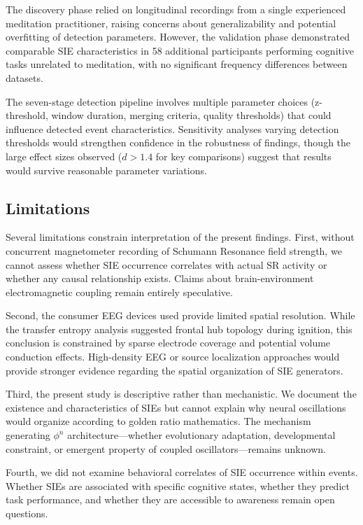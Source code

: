 \documentclass[11pt,a4paper]{article}
\begin{document}
The discovery phase relied on longitudinal recordings from a single experienced meditation practitioner, raising concerns about generalizability and potential overfitting of detection parameters. However, the validation phase demonstrated comparable SIE characteristics in 58 additional participants performing cognitive tasks unrelated to meditation, with no significant frequency differences between datasets.

The seven-stage detection pipeline involves multiple parameter choices (z-threshold, window duration, merging criteria, quality thresholds) that could influence detected event characteristics. Sensitivity analyses varying detection thresholds would strengthen confidence in the robustness of findings, though the large effect sizes observed ($d > 1.4$ for key comparisons) suggest that results would survive reasonable parameter variations.

\subsection{Limitations}

Several limitations constrain interpretation of the present findings. First, without concurrent magnetometer recording of Schumann Resonance field strength, we cannot assess whether SIE occurrence correlates with actual SR activity or whether any causal relationship exists. Claims about brain-environment electromagnetic coupling remain entirely speculative.

Second, the consumer EEG devices used provide limited spatial resolution. While the transfer entropy analysis suggested frontal hub topology during ignition, this conclusion is constrained by sparse electrode coverage and potential volume conduction effects. High-density EEG or source localization approaches would provide stronger evidence regarding the spatial organization of SIE generators.

Third, the present study is descriptive rather than mechanistic. We document the existence and characteristics of SIEs but cannot explain why neural oscillations would organize according to golden ratio mathematics. The mechanism generating $\phi^n$ architecture—whether evolutionary adaptation, developmental constraint, or emergent property of coupled oscillators—remains unknown.

Fourth, we did not examine behavioral correlates of SIE occurrence within events. Whether SIEs are associated with specific cognitive states, whether they predict task performance, and whether they are accessible to awareness remain open questions.
\end{document}
